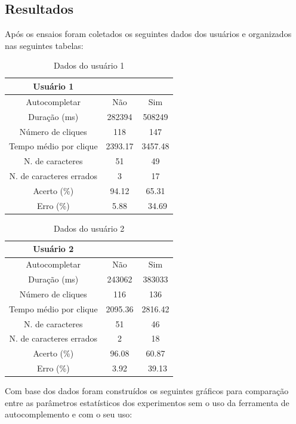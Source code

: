 \documentclass[twoside]{article}
\begin{document}
\begin{multicols}{2}
\section{Resultados}

Após os ensaios foram coletados os seguintes dados dos usuários e organizados nas seguintes tabelas:

\begin{table}[H]
\caption{Dados do usuário 1}
\centering
\begin{tabular}{ccc}
\toprule
 Usuário 1 &  & \\
\midrule
Autocompletar & Não & Sim\\
Duração (ms) & 282394 & 508249\\
Número de cliques & 118 & 147\\
Tempo médio por clique & 2393.17 & 3457.48\\
N. de caracteres & 51 & 49\\
N. de caracteres errados & 3 & 17\\
Acerto (\%) & 94.12 & 65.31\\
Erro (\%) & 5.88 &\ 34.69\\
\bottomrule
\end{tabular}
\end{table}


\begin{table}[H]
\caption{Dados do usuário 2}
\centering
\begin{tabular}{ccc}
\toprule
 Usuário 2 &  & \\
\midrule
Autocompletar & Não & Sim\\
Duração (ms) & 243062 & 383033\\
Número de cliques & 116 & 136\\
Tempo médio por clique & 2095.36 & 2816.42\\
N. de caracteres & 51 & 46\\
N. de caracteres errados & 2 & 18\\
Acerto (\%) & 96.08 & 60.87\\
Erro (\%) & 3.92 &\ 39.13\\
\bottomrule
\end{tabular}
\end{table}

\noindent Com base dos dados foram construídos os seguintes gráficos para comparação entre as parâmetros estatísticos dos experimentos sem o uso da ferramenta de autocomplemento e com o seu uso:


\end{multicols}
\end{document}

